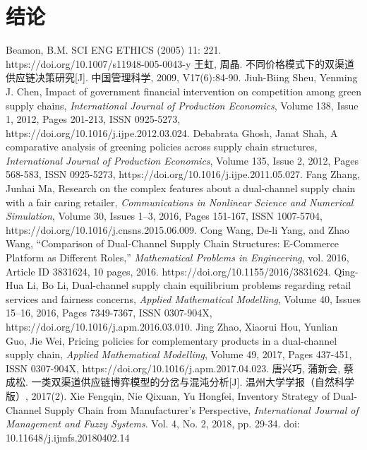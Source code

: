 \documentclass{article}
\begin{document}
\section{结论}
\par

\begin{thebibliography}{1}
 Beamon, B.M. SCI ENG ETHICS (2005) 11: 221. https://doi.org/10.1007/s11948-005-0043-y
 王虹, 周晶. 不同价格模式下的双渠道供应链决策研究[J]. 中国管理科学, 2009, V17(6):84-90.
 Jiuh-Biing Sheu, Yenming J. Chen, Impact of government financial intervention on competition among green supply chains, \emph{International Journal of Production Economics}, Volume 138, Issue 1, 2012, Pages 201-213, ISSN 0925-5273, https://doi.org/10.1016/j.ijpe.2012.03.024.
 Debabrata Ghosh, Janat Shah, A comparative analysis of greening policies across supply chain structures, \emph{International Journal of Production Economics}, Volume 135, Issue 2, 2012, Pages 568-583, ISSN 0925-5273, https://doi.org/10.1016/j.ijpe.2011.05.027.
 Fang Zhang, Junhai Ma, Research on the complex features about a dual-channel supply chain with a fair caring retailer, \emph{Communications in Nonlinear Science and Numerical Simulation}, Volume 30, Issues 1–3, 2016, Pages 151-167, ISSN 1007-5704, https://doi.org/10.1016/j.cnsns.2015.06.009.
 Cong Wang, De-li Yang, and Zhao Wang, “Comparison of Dual-Channel Supply Chain Structures: E-Commerce Platform as Different Roles,” \emph{Mathematical Problems in Engineering}, vol. 2016, Article ID 3831624, 10 pages, 2016. https://doi.org/10.1155/2016/3831624.
 Qing-Hua Li, Bo Li, Dual-channel supply chain equilibrium problems regarding retail services and fairness concerns, \emph{Applied Mathematical Modelling}, Volume 40, Issues 15–16, 2016, Pages 7349-7367, ISSN 0307-904X, https://doi.org/10.1016/j.apm.2016.03.010.
 Jing Zhao, Xiaorui Hou, Yunlian Guo, Jie Wei, Pricing policies for complementary products in a dual-channel supply chain, \emph{Applied Mathematical Modelling}, Volume 49, 2017, Pages 437-451, ISSN 0307-904X, https://doi.org/10.1016/j.apm.2017.04.023.
 唐兴巧, 蒲新会, 蔡成松. 一类双渠道供应链博弈模型的分岔与混沌分析[J]. 温州大学学报（自然科学版）, 2017(2).
 Xie Fengqin, Nie Qixuan, Yu Hongfei, Inventory Strategy of Dual-Channel Supply Chain from Manufacturer's Perspective, \emph{International Journal of Management and Fuzzy Systems}. Vol. 4, No. 2, 2018, pp. 29-34. doi: 10.11648/j.ijmfs.20180402.14

\end{thebibliography}
\end{document}
